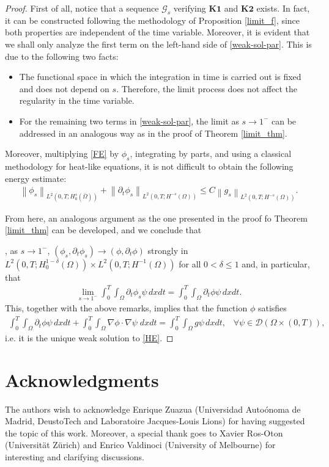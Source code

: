 \documentclass[reqno,twoside]{amsart}
\numberwithin{equation}{section}
\newcommand{\norm}[2]{{\left\|#1\right\|}_{#2}}
\newcommand{\rouge}[1]{{\color{red}#1}}
\begin{document}
\begin{proof}
First of all, notice that a sequence $\mathcal{G}_s$ verifying $\textbf{K1}$ and $\textbf{K2}$ exists. In fact, it can be constructed following the methodology of Proposition \ref{limit_f}, since both properties are independent of the time variable. Moreover, it is evident that we shall only analyze  the first term on the left-hand side of \eqref{weak-sol-par}. This is due to the following two facts:
\begin{itemize}
	\item The functional space in which the integration in time is carried out is fixed and does not depend on $s$. Therefore, the limit process does not affect the regularity in the time variable.
	
	\item For the remaining two terms in \eqref{weak-sol-par}, the limit as $s\to 1^-$ can be addressed in an analogous way as in the proof of Theorem \ref{limit_thm}.
\end{itemize}

\rouge{ 
Moreover, multiplying \eqref{FE} by $\phi_s$, integrating by parts, and using a classical methodology for heat-like equations, it is not difficult to obtain the following energy estimate:
\begin{align*}
	\norm{\phi_s}{L^2(0,T;H_0^s(\overline{\Omega}))} + \norm{\partial_t\phi_s}{L^2(0,T;H^{-s}(\Omega))}\leq C\norm{g_s}{L^2(0,T;H^{-s}(\Omega))}.
\end{align*}

From here, an analogous argument as the one presented in the proof fo Theorem \ref{limit_thm} can be developed, and we conclude that}, as $s\to 1^-$, $(\phi_s,\partial_t\phi_s)\to (\phi,\partial_t\phi)$ strongly in $L^2(0,T;H^{1-\delta}_0(\Omega))\times L^2(0,T;H^{-1}(\Omega))$ for all $0<\delta\leq 1$ and, in particular, that 
\begin{align*}
	\lim_{s\to 1^-}\int_0^T\int_{\Omega} \partial_t\phi_s\psi\,dxdt = \int_0^T\int_{\Omega} \partial_t\phi\psi\,dxdt.
\end{align*}
This, together with the above remarks, implies that the function $\phi$ satisfies
\begin{align*}
	\int_0^T \int_\Omega\partial_t\phi\psi\,dxdt + \int_0^T\int_\Omega \nabla\phi\cdot\nabla\psi\;dxdt = \int_0^T\int_\Omega g\psi\,dxdt, \;\;\; \forall\psi\in\mathcal{D}(\Omega\times(0,T)),
\end{align*}
i.e. it is the unique weak solution to \eqref{HE}.
\end{proof}

\section*{Acknowledgments}

The authors wish to acknowledge Enrique Zuazua (Universidad Auto\'onoma de Madrid, DeustoTech and Laboratoire Jacques-Louis Lions) for having suggested the topic of this work. Moreover, a special thank goes to Xavier Ros-Oton (Universit\"at Z\"urich) and Enrico Valdinoci (University of Melbourne) for interesting and clarifying discussions.

\end{document}
